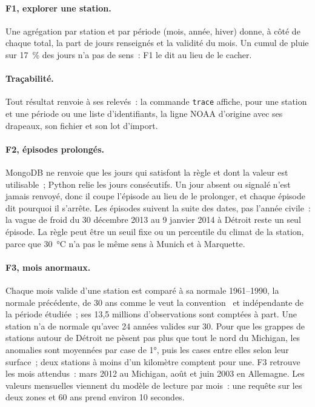 \paragraph{F1, explorer une station.} Une agrégation par station et par période (mois, année, hiver) donne, à côté de chaque total, la part de jours renseignés et la validité du mois. Un cumul de pluie sur 17~\% des jours n'a pas de sens~: F1 le dit au lieu de le cacher.

\paragraph{Traçabilité.} Tout résultat renvoie à ses relevés~: la commande \texttt{trace} affiche, pour une station et une période ou une liste d'identifiants, la ligne NOAA d'origine avec ses drapeaux, son fichier et son lot d'import.

\paragraph{F2, épisodes prolongés.} MongoDB ne renvoie que les jours qui satisfont la règle et dont la valeur est utilisable~; Python relie les jours consécutifs. Un jour absent ou signalé n'est jamais renvoyé, donc il coupe l'épisode au lieu de le prolonger, et chaque épisode dit pourquoi il s'arrête. Les épisodes suivent la suite des dates, pas l'année civile~: la vague de froid du 30 décembre 2013 au 9 janvier 2014 à Détroit reste un seul épisode. La règle peut être un seuil fixe ou un percentile du climat de la station, parce que 30~°C n'a pas le même sens à Munich et à Marquette.

\paragraph{F3, mois anormaux.} Chaque mois valide d'une station est comparé à sa normale 1961--1990, la normale précédente, de 30 ans comme le veut la convention~\cite{wmo2017} et indépendante de la période étudiée~; ses 13,5 millions d'observations sont comptées à part. Une station n'a de normale qu'avec 24 années valides sur 30. Pour que les grappes de stations autour de Détroit ne pèsent pas plus que tout le nord du Michigan, les anomalies sont moyennées par case de 1°, puis les cases entre elles selon leur surface~; deux stations à moins d'un kilomètre comptent pour une. F3 retrouve les mois attendus~: mars 2012 au Michigan, août et juin 2003 en Allemagne. Les valeurs mensuelles viennent du modèle de lecture par mois~: une requête sur les deux zones et 60 ans prend environ 10 secondes.

